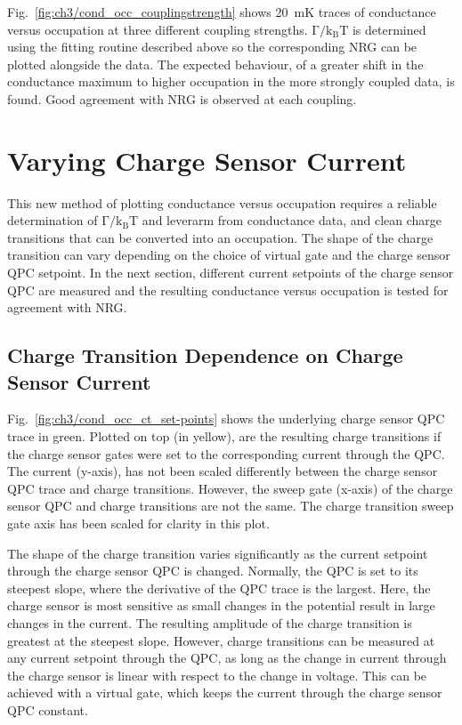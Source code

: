 Fig.~\ref{fig:ch3/cond_occ_couplingstrength} shows \qty{20}{mK} traces of conductance versus occupation at three different coupling strengths. $\mathrm{\Gamma/k_BT}$ is determined using the fitting routine described above so the corresponding NRG can be plotted alongside the data. The expected behaviour, of a greater shift in the conductance maximum to higher occupation in the more strongly coupled data, is found. Good agreement with NRG is observed at each coupling.







\section{Varying Charge Sensor Current}

This new method of plotting conductance versus occupation requires a reliable determination of $\mathrm{\Gamma/k_BT}$ and leverarm from conductance data, and clean charge transitions that can be converted into an occupation. The shape of the charge transition can vary depending on the choice of virtual gate and the charge sensor QPC setpoint. In the next section, different current setpoints of the charge sensor QPC are measured and the resulting conductance versus occupation is tested for agreement with NRG.

\subsection{Charge Transition Dependence on Charge Sensor Current}

Fig.~\ref{fig:ch3/cond_occ_ct_set-points} shows the underlying charge sensor QPC trace in green. Plotted on top (in yellow), are the resulting charge transitions if the charge sensor gates were set to the corresponding current through the QPC. The current (y-axis), has not been scaled differently between the charge sensor QPC trace and charge transitions. However, the sweep gate (x-axis) of the charge sensor QPC and charge transitions are not the same. The charge transition sweep gate axis has been scaled for clarity in this plot. 



The shape of the charge transition varies significantly as the current setpoint through the charge sensor QPC is changed. Normally, the QPC is set to its steepest slope, where the derivative of the QPC trace is the largest. Here, the charge sensor is most sensitive as small changes in the potential result in large changes in the current. The resulting amplitude of the charge transition is greatest at the steepest slope. However, charge transitions can be measured at any current setpoint through the QPC, as long as the change in current through the charge sensor is linear with respect to the change in voltage. This can be achieved with a virtual gate, which keeps the current through the charge sensor QPC constant. 

